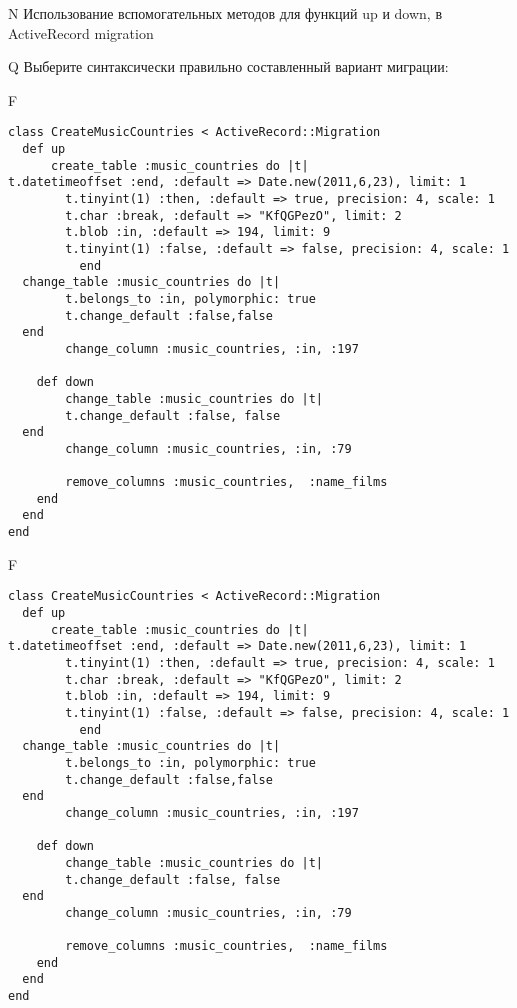 N
Использование вспомогательных методов для функций up и down, в ActiveRecord migration

Q
Выберите синтаксически правильно составленный вариант миграции:

F
\begin{verbatim}
class CreateMusicCountries < ActiveRecord::Migration
  def up
	  create_table :music_countries do |t|
t.datetimeoffset :end, :default => Date.new(2011,6,23), limit: 1
		t.tinyint(1) :then, :default => true, precision: 4, scale: 1
		t.char :break, :default => "KfQGPezO", limit: 2
		t.blob :in, :default => 194, limit: 9
		t.tinyint(1) :false, :default => false, precision: 4, scale: 1
		  end
  change_table :music_countries do |t|
		t.belongs_to :in, polymorphic: true
 		t.change_default :false,false
  end
 		change_column :music_countries, :in, :197
   
	def down
		change_table :music_countries do |t|
		t.change_default :false, false
  end
 		change_column :music_countries, :in, :79
   
		remove_columns :music_countries,  :name_films 
    end 
  end
end

\end{verbatim}

F
\begin{verbatim}
class CreateMusicCountries < ActiveRecord::Migration
  def up
	  create_table :music_countries do |t|
t.datetimeoffset :end, :default => Date.new(2011,6,23), limit: 1
		t.tinyint(1) :then, :default => true, precision: 4, scale: 1
		t.char :break, :default => "KfQGPezO", limit: 2
		t.blob :in, :default => 194, limit: 9
		t.tinyint(1) :false, :default => false, precision: 4, scale: 1
		  end
  change_table :music_countries do |t|
		t.belongs_to :in, polymorphic: true
 		t.change_default :false,false
  end
 		change_column :music_countries, :in, :197
   
	def down
		change_table :music_countries do |t|
		t.change_default :false, false
  end
 		change_column :music_countries, :in, :79
   
		remove_columns :music_countries,  :name_films 
    end 
  end
end

\end{verbatim}

